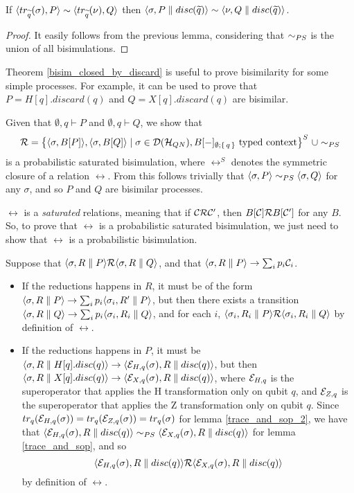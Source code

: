 \begin{theorem}\label{bisim_closed_by_discard}
If $\langle tr_{\widetilde{q}}(\sigma), P\rangle \sim \langle tr_{\widetilde{q}}(\nu), Q\rangle$ then $\langle\sigma, P \parallel disc(\widetilde{q})\rangle \sim \langle\nu, Q \parallel disc(\widetilde{q})\rangle$.
\end{theorem}
\begin{proof}
It easily follows from the previous lemma, considering that $\sim_{PS}$ is the union of all bisimulations.
\end{proof}

Theorem \ref{bisim_closed_by_discard} is useful to prove bisimilarity for some simple processes. For example, it can be used to prove that $P = H[q].discard(q)$ and $Q = X[q].discard(q)$ are bisimilar.

Given that $\emptyset, {q} \vdash P$ and $\emptyset, {q} \vdash Q$, we show that
\[\mathcal{R} = \big\{\langle\sigma, B[P]\rangle, \langle\sigma, B[Q]\rangle \mid \sigma \in \mathcal{D}(\mathcal{H}_{QN}), B[{-}]_{\emptyset; \set{q}} \text{ typed context}\big\}^S\ \cup \sim_{PS}
\]
is a probabilistic saturated bisimulation, where $\rel^S$ denotes the symmetric closure of a relation $\rel$. From this follows trivially that $\langle\sigma, P\rangle \sim_{PS} \langle\sigma, Q\rangle$ for any $\sigma$, and so $P$ and $Q$ are bisimilar processes.

$\rel$ is a \textit{saturated} relations, meaning that if $\mathcal{C} \mathcal{R} \mathcal{C}'$, then $B[\mathcal{C}] \mathcal{R} B[\mathcal{C}']$ for any $B$. So, to prove that $\rel$ is a probabilistic saturated bisimulation, we just need to show that $\rel$ is a probabilistic bisimulation.

Suppose that $\langle\sigma, R \parallel P\rangle \mathcal{R} \langle\sigma, R \parallel Q\rangle$, and that $\langle\sigma, R \parallel P\rangle \rightarrow \sum_i p_i \mathcal{C}_i$.\begin{itemize}
\item If the reductions happens in $R$, it must be of the form $\langle\sigma, R \parallel P\rangle \rightarrow \sum_i p_i \langle\sigma_i, R' \parallel P\rangle$, but then there exists a transition $\langle\sigma, R \parallel Q\rangle \rightarrow \sum_i p_i \langle\sigma_i, R_i \parallel Q\rangle$, and for each $i$, $\langle\sigma_i, R_i \parallel P\rangle \mathcal{R} \langle\sigma_i, R_i \parallel Q\rangle$ by definition of $\rel$.
\item If the reductions happens in $P$, it must be 
 $\langle\sigma, R \parallel H[q].disc(q)\rangle \rightarrow \langle\mathcal{E}_{H, q}(\sigma), R \parallel disc(q)\rangle$, but then  $\langle\sigma, R \parallel X[q].disc(q)\rangle \rightarrow \langle\mathcal{E}_{X, q}(\sigma), R \parallel disc(q)\rangle$, where $\mathcal{E}_{H, q}$ is the superoperator that applies the H transformation only on qubit $q$, and $\mathcal{E}_{Z, q}$ is the superoperator that applies the Z transformation only on qubit $q$. 
Since $tr_q(\mathcal{E}_{H, q}(\sigma)) = tr_q(\mathcal{E}_{Z, q}(\sigma)) = tr_q(\sigma)$ for lemma \ref{trace_and_sop_2}, we have that $\langle\mathcal{E}_{H, q}(\sigma), R \parallel disc(q)\rangle \sim_{PS} \langle\mathcal{E}_{X, q}(\sigma), R \parallel disc(q)\rangle$ for lemma \ref{trace_and_sop}, and so $$\langle\mathcal{E}_{H, q}(\sigma), R \parallel disc(q)\rangle \mathcal{R} \langle\mathcal{E}_{X, q}(\sigma), R \parallel disc(q)\rangle$$ by definition of $\rel$.
 
\end{itemize}
